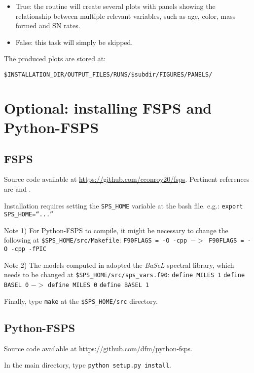 \documentclass[manuscript]{aastex}
\begin{document}
\begin{itemize}
\item True: the routine will create several plots with panels showing the relationship between multiple relevant variables, such as age, color, mass formed and SN rates.
\item False: this task will simply be skipped.
\end{itemize}

The produced plots are stored at: 

\texttt{\$INSTALLATION\_DIR/OUTPUT\_FILES/RUNS/\$subdir/FIGURES/PANELS/}

\section{Optional: installing FSPS and Python-FSPS}
\label{sec:optional}

\subsection{FSPS}
\label{subsec:fsps}

Source code available at \href{https://github.com/cconroy20/fsps}{https://github.com/cconroy20/fsps}. Pertinent references are \citet{Conroy2009_fspsI} and \citet{Conroy2010_fspsII}.
      
Installation requires setting the \texttt{SPS\_HOME} variable at the
bash file. e.g.: \texttt{export SPS\_HOME=``...''}

Note 1) For Python-FSPS to compile, it might be necessary to change the following at \texttt{\$SPS\_HOME/src/Makefile}:
\texttt{F90FLAGS = -O -cpp $->$ F90FLAGS = -O -cpp -fPIC}

Note 2) The models computed in \citet{Heringer2017_DTD} adopted the \textit{BaSeL} spectral library, which needs to be changed at \texttt{\$SPS\_HOME/src/sps\_vars.f90}:
\texttt{define MILES 1}
\texttt{define BASEL 0}
$->$
\texttt{define MILES 0}
\texttt{define BASEL 1}

Finally, type \texttt{make} at the \texttt{\$SPS\_HOME/src} directory.

\subsection{Python-FSPS}
\label{subsec:Python-fsps}

Source code available at \href{https://github.com/dfm/python-fsps}{https://github.com/dfm/python-fsps}.

In the main directory, type \texttt{python setup.py install}.



\end{document}
